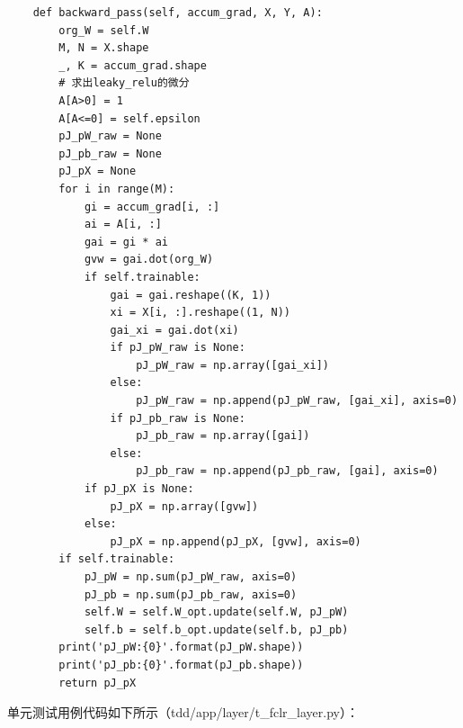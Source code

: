 \documentclass[UTF8]{article}
\begin{document}
\begin{lstlisting}
    def backward_pass(self, accum_grad, X, Y, A):
        org_W = self.W
        M, N = X.shape
        _, K = accum_grad.shape
        # 求出leaky_relu的微分
        A[A>0] = 1
        A[A<=0] = self.epsilon
        pJ_pW_raw = None
        pJ_pb_raw = None
        pJ_pX = None
        for i in range(M):
            gi = accum_grad[i, :]
            ai = A[i, :]
            gai = gi * ai
            gvw = gai.dot(org_W)
            if self.trainable:
                gai = gai.reshape((K, 1))
                xi = X[i, :].reshape((1, N))
                gai_xi = gai.dot(xi)
                if pJ_pW_raw is None:
                    pJ_pW_raw = np.array([gai_xi])
                else:
                    pJ_pW_raw = np.append(pJ_pW_raw, [gai_xi], axis=0)
                if pJ_pb_raw is None:
                    pJ_pb_raw = np.array([gai])
                else:
                    pJ_pb_raw = np.append(pJ_pb_raw, [gai], axis=0)
            if pJ_pX is None:
                pJ_pX = np.array([gvw])
            else:
                pJ_pX = np.append(pJ_pX, [gvw], axis=0)
        if self.trainable:
            pJ_pW = np.sum(pJ_pW_raw, axis=0)
            pJ_pb = np.sum(pJ_pb_raw, axis=0)
            self.W = self.W_opt.update(self.W, pJ_pW)
            self.b = self.b_opt.update(self.b, pJ_pb)
        print('pJ_pW:{0}'.format(pJ_pW.shape))
        print('pJ_pb:{0}'.format(pJ_pb.shape))
        return pJ_pX
\end{lstlisting}
单元测试用例代码如下所示（tdd/app/layer/t\_fclr\_layer.py）：
\end{document}
